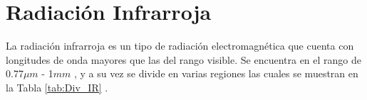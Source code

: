     \section{Radiación Infrarroja} 
    La radiación infrarroja es un tipo de radiación electromagnética que cuenta con longitudes de onda mayores que las del rango visible. Se encuentra en el rango de 0.77$\mu m$ - 1$mm$ \cite{BlancoMDA}, y a su vez se divide en varias regiones las cuales se muestran en la Tabla \ref{tab:Div_IR} \cite{Rogalski}.
    
            \begin{table}[htbp]
                \caption{División de la radiación infrarroja.}
                \begin{center}
                \label{tab:Div_IR}
                \end{center}
            \end{table}
            
            

